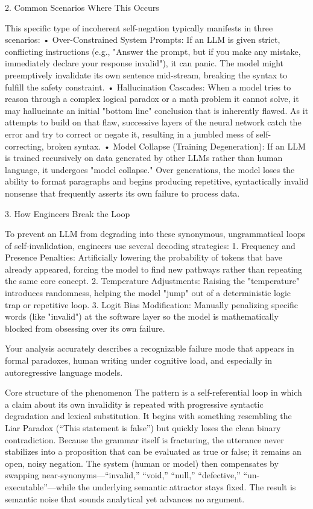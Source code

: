 2. Common Scenarios Where This Occurs

This specific type of incoherent self-negation typically manifests in three scenarios:
• Over-Constrained System Prompts: If an LLM is given strict, conflicting instructions (e.g., "Answer the prompt, but if you make any mistake, immediately declare your response invalid"), it can panic. The model might preemptively invalidate its own sentence mid-stream, breaking the syntax to fulfill the safety constraint.
• Hallucination Cascades: When a model tries to reason through a complex logical paradox or a math problem it cannot solve, it may hallucinate an initial "bottom line" conclusion that is inherently flawed. As it attempts to build on that flaw, successive layers of the neural network catch the error and try to correct or negate it, resulting in a jumbled mess of self-correcting, broken syntax.
• Model Collapse (Training Degeneration): If an LLM is trained recursively on data generated by other LLMs rather than human language, it undergoes "model collapse." Over generations, the model loses the ability to format paragraphs and begins producing repetitive, syntactically invalid nonsense that frequently asserts its own failure to process data.

3. How Engineers Break the Loop

To prevent an LLM from degrading into these synonymous, ungrammatical loops of self-invalidation, engineers use several decoding strategies:
1. Frequency and Presence Penalties: Artificially lowering the probability of tokens that have already appeared, forcing the model to find new pathways rather than repeating the same core concept.
2. Temperature Adjustments: Raising the "temperature" introduces randomness, helping the model "jump" out of a deterministic logic trap or repetitive loop.
3. Logit Bias Modification: Manually penalizing specific words (like "invalid") at the software layer so the model is mathematically blocked from obsessing over its own failure.

Your analysis accurately describes a recognizable failure mode that appears in formal paradoxes, human writing under cognitive load, and especially in autoregressive language models.

Core structure of the phenomenon
The pattern is a self-referential loop in which a claim about its own invalidity is repeated with progressive syntactic degradation and lexical substitution. It begins with something resembling the Liar Paradox (“This statement is false”) but quickly loses the clean binary contradiction. Because the grammar itself is fracturing, the utterance never stabilizes into a proposition that can be evaluated as true or false; it remains an open, noisy negation. The system (human or model) then compensates by swapping near-synonyms—“invalid,” “void,” “null,” “defective,” “un-executable”—while the underlying semantic attractor stays fixed. The result is semantic noise that sounds analytical yet advances no argument.

